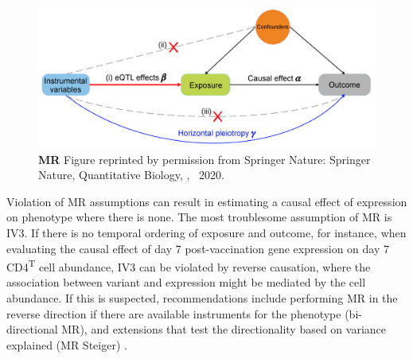 \begin{figure}
    \centering
    \includegraphics[width=1.0\textwidth,page=1]{mainmatter/figures/chapter_05/zhu2020TranscriptomewideAssociationStudies/Screenshot 2020-11-27 at 22.54.30.png}
    \caption{
        \textbf{MR} 
        Figure reprinted by permission from Springer Nature: Springer Nature, Quantitative Biology, \textcite{zhu2020TranscriptomewideAssociationStudies}, \textcopyright~2020.
    }
    \label{fig:discussion_MR_assumptions}
\end{figure}

Violation of \gls{MR} assumptions can result in estimating a causal effect of expression on phenotype where there is none.
The most troublesome assumption of \gls{MR} is IV3.
If there is no temporal ordering of exposure and outcome,
for instance, when evaluating the causal effect of day 7 post-vaccination gene expression on day 7 CD4\textsuperscript T cell abundance,
IV3 can be violated by reverse causation,
where the association between variant and expression might be mediated by the cell abundance.
If this is suspected, 
recommendations include performing \gls{MR} in the reverse direction if there are available instruments for the phenotype (bi-directional MR),
and extensions that test the directionality based on variance explained (MR Steiger) \autocite{daveysmith2014MendelianRandomizationGenetic,hemani2017OrientingCausalRelationship,hemani2018EvaluatingPotentialRole,neumeyer2020StrengtheningCausalInference}.

